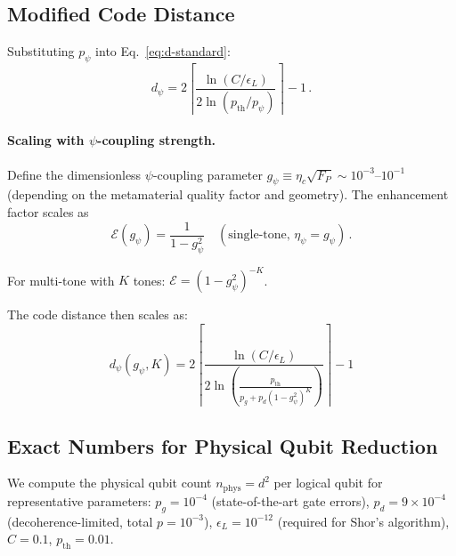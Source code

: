 \documentclass[aps,prl,twocolumn,superscriptaddress,nofootinbib,longbibliography]{revtex4-2}
\begin{document}
\subsection{Modified Code Distance}

Substituting $p_\psi$ into Eq.~\eqref{eq:d-standard}:
\begin{equation}\label{eq:d-psi}
d_\psi = 2\left\lceil\frac{\ln(C/\epsilon_L)}
{2\ln(p_{\text{th}}/p_\psi)}\right\rceil - 1\,.
\end{equation}

\paragraph{Scaling with $\psi$-coupling strength.}
Define the dimensionless $\psi$-coupling parameter $g_\psi \equiv
\eta_c\sqrt{F_P} \sim 10^{-3}$--$10^{-1}$ (depending on the
metamaterial quality factor and geometry). The enhancement factor scales
as
\begin{equation}
\mathcal{E}(g_\psi) = \frac{1}{1 - g_\psi^2}\quad
(\text{single-tone, $\eta_\psi = g_\psi$})\,.
\end{equation}

For multi-tone with $K$ tones: $\mathcal{E} = (1 - g_\psi^2)^{-K}$.

The code distance then scales as:
\begin{equation}\label{eq:d-scaling}
\boxed{
d_\psi(g_\psi, K) = 2\left\lceil
\frac{\ln(C/\epsilon_L)}
{2\ln\!\left(\frac{p_{\text{th}}}{p_g + p_d(1 - g_\psi^2)^K}\right)}
\right\rceil - 1
}
\end{equation}

\subsection{Exact Numbers for Physical Qubit Reduction}

We compute the physical qubit count $n_{\text{phys}} = d^2$ per logical
qubit for representative parameters: $p_g = 10^{-4}$ (state-of-the-art
gate errors), $p_d = 9\times 10^{-4}$ (decoherence-limited, total
$p = 10^{-3}$), $\epsilon_L = 10^{-12}$ (required for Shor's algorithm),
$C = 0.1$, $p_{\text{th}} = 0.01$.
\end{document}
